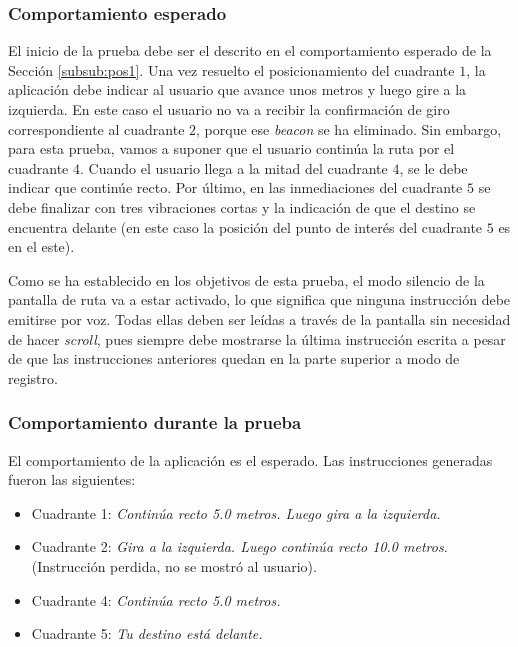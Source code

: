 \subsubsection*{Comportamiento esperado}

El inicio de la prueba debe ser el descrito en el comportamiento esperado de la Sección \ref{subsub:pos1}. Una vez resuelto el posicionamiento del cuadrante $1$, la aplicación debe indicar al usuario que avance unos metros y luego gire a la izquierda. En este caso el usuario no va a recibir la confirmación de giro correspondiente al cuadrante $2$, porque ese \textit{beacon} se ha eliminado. Sin embargo, para esta prueba, vamos a suponer que el usuario continúa la ruta por el cuadrante $4$. Cuando el usuario llega a la mitad del cuadrante $4$, se le debe indicar que continúe recto. Por último, en las inmediaciones del cuadrante $5$ se debe finalizar con tres vibraciones cortas y la indicación de que el destino se encuentra delante (en este caso la posición del punto de interés del cuadrante $5$ es en el este).

Como se ha establecido en los objetivos de esta prueba, el modo silencio de la pantalla de ruta va a estar activado, lo que significa que ninguna instrucción debe emitirse por voz. Todas ellas deben ser leídas a través de la pantalla sin necesidad de hacer \textit{scroll}, pues siempre debe mostrarse la última instrucción escrita a pesar de que las instrucciones anteriores quedan en la parte superior a modo de registro. 


\subsubsection*{Comportamiento durante la prueba}

El comportamiento de la aplicación es el esperado. Las instrucciones generadas fueron las siguientes: 


\begin{itemize}
	\item Cuadrante 1: \textit{Continúa recto 5.0 metros. Luego gira a la izquierda.}
	
	\item Cuadrante 2: \textit{Gira a la izquierda. Luego continúa recto 10.0 metros.} (Instrucción perdida, no se mostró al usuario).
	
	\item Cuadrante 4: \textit{Continúa recto 5.0 metros.}
	
	\item Cuadrante 5: \textit{Tu destino está delante.}
	
\end{itemize}


